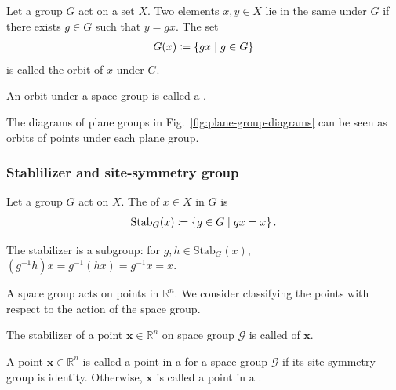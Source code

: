 \begin{screen}
  \begin{defn}[orbit]
    Let a group $G$ act on a set $X$.
    Two elements $x, y \in X$ lie in the same  under $G$ if there exists $g \in G$ such that $y = gx$.
    The set
    \begin{align}
      G(x) \coloneqq \left\{ gx \mathrel{}\middle|\mathrel{} g \in G \right\}
    \end{align}
    is called the orbit of $x$ under $G$.
  \end{defn}
\end{screen}

\begin{screen}
  \begin{defn}
    An orbit under a space group is called a .
  \end{defn}
\end{screen}

The diagrams of plane groups in Fig.~\ref{fig:plane-group-diagrams} can be seen as orbits of points under each plane group.

\subsubsection{Stablilizer and site-symmetry group}

\begin{screen}
  \begin{defn}[stabilizer]
    Let a group $G$ act on $X$.
    The  of $x \in X$ in $G$ is
    \begin{align}
      \mathrm{Stab}_{G}(x) \coloneqq \left\{  g \in G  \mathrel{}\middle|\mathrel{}  gx = x  \right\}.
    \end{align}
  \end{defn}
\end{screen}
The stabilizer is a subgroup: for $g, h \in \mathrm{Stab}_{G}(x)$, $(g^{-1}h) x = g^{-1} (h x) = g^{-1}x = x$.

A space group acts on points in $\mathbb{R}^{n}$.
We consider classifying the points with respect to the action of the space group.
\begin{screen}
  \begin{defn}
    The stabilizer of a point $\bm{x} \in \mathbb{R}^{n}$ on space group $\mathcal{G}$ is called  of $\bm{x}$.
  \end{defn}
\end{screen}

\begin{screen}
  \begin{defn}
    A point $\bm{x} \in \mathbb{R}^{n}$ is called a point in a  for a space group $\mathcal{G}$ if its site-symmetry group is identity.
    Otherwise, $\bm{x}$ is called a point in a .
  \end{defn}
\end{screen}

